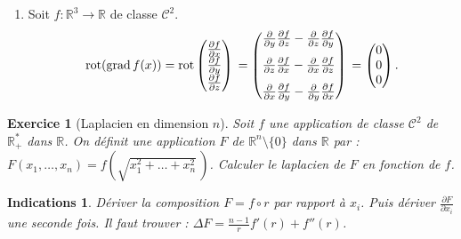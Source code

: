 \documentclass[11pt,a4paper]{article}
\newcommand{\Rr}{\mathbb{R}} \newcommand{\R}{\mathbb{R}}
\theoremstyle{exostyle}
\newtheorem{exo}{Exercice}
\newtheorem{ind}{Indications}
\newcommand{\exercice}[1]{} \newcommand{\finexercice}{}
\newcommand{\enonce}{\begin{exo}} \newcommand{\finenonce}{\end{exo}}
\newcommand{\indication}{\begin{ind}} \newcommand{\finindication}{\end{ind}}
\newcommand{\grad}{\operatorname{grad}} %
\newcommand{\rot}{\operatorname{rot}}
\begin{document}
\begin{enumerate}
\item Soit $f : \Rr^3 \to \Rr$ de classe $\mathcal{C}^2$.
\[
\rot( \grad f(x) ) 
= \rot \begin{pmatrix}
	\frac{\partial f}{\partial x} \\
	\frac{\partial f}{\partial y} \\
	\frac{\partial f}{\partial z} \\
	\end{pmatrix}  \\
= \begin{pmatrix}
	\frac{\partial }{\partial y}\frac{\partial f}{\partial z}-\frac{\partial }{\partial z}\frac{\partial f}{\partial y} \\[2ex]
	\frac{\partial }{\partial z}\frac{\partial f}{\partial x}-\frac{\partial }{\partial x}\frac{\partial f}{\partial z} \\[2ex]
	\frac{\partial }{\partial x}\frac{\partial f}{\partial y}-\frac{\partial }{\partial y}\frac{\partial f}{\partial x} 
\end{pmatrix} \\
= \begin{pmatrix} 0 \\ 0 \\0 \end{pmatrix}.
\]

\end{enumerate}
\fincorrection

\finexercice



\exercice{4145, quercia, 2010/03/11}
\enonce[Laplacien en dimension $n$]

Soit $f$ une application de classe $\mathcal{C}^2$ de $\Rr_+^*$ dans $\Rr$.
On définit une application $F$ de $\Rr^n\setminus\{0\}$ dans $\Rr$ par :
$F(x_1,\dots,x_n) = f \left(\sqrt{x_1^2 + \dots + x_n^2}\,\right)$.
Calculer le laplacien de $F$ en fonction de $f$.
\finenonce

\indication
Dériver la composition $F = f \circ r$ par rapport à $x_i$. Puis dériver $\frac{\partial F}{\partial x_i}$ une seconde fois.
Il faut trouver : $\Delta F = \frac{n-1}r f'(r) + f''(r)$.

\finindication 
\end{document}
